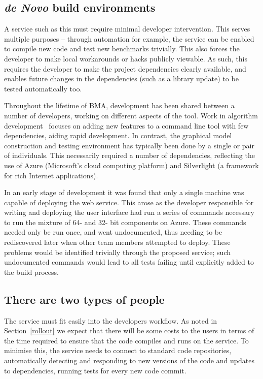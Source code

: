 \documentclass{llncs}
\begin{document}
\subsection{{\em de Novo} build environments} 
 
A service such as this must require minimal developer intervention.
This serves multiple purposes -- through automation for example, the
service can be enabled to compile new code and test new benchmarks
trivially. This also forces the developer to make local workarounds or
hacks publicly viewable. As such, this requires the developer to make
the project dependencies clearly available, and enables future changes
in the dependencies (such as a library update) to be tested
automatically too.

Throughout the lifetime of BMA, development has been shared between a 
number of developers, working on different aspects of the tool. Work in 
algorithm development~\cite{cook2014,piterman2013} focuses on adding 
new features to a command line tool with few dependencies, aiding rapid 
development. In contrast, the graphical model construction and testing 
environment has typically been done by a single or pair of individuals. 
This necessarily required a number of dependencies, reflecting the use
of Azure (Microsoft's cloud computing platform) and Silverlight (a
framework for rich Internet applications).

In an early stage of development it was found that only a single
machine was capable of deploying the web service. This arose as the
developer responsible for writing and deploying the user interface had
run a series of commands necessary to run the mixture of 64- and 32-
bit components on Azure. These commands needed only be run once, and
went undocumented, thus needing to be rediscovered later when other
team members attempted to deploy.  These problems would be identified
trivially through the proposed service; such undocumented commands
would lead to all tests failing until explicitly added to the build
process.

\subsection{There are two types of people} 

The service must fit easily into the developers workflow. As
noted in Section~\ref{rollout} we expect that there will be some costs
to the users in terms of the time required to ensure that the code
compiles and runs on the service. To minimise this, the service needs
to connect to standard code repositories, automatically detecting and
responding to new versions of the code and updates to dependencies,
running tests for every new code commit.
\end{document}
